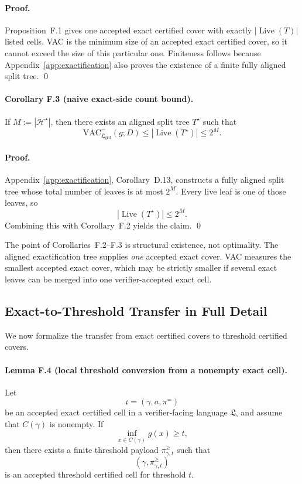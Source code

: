 \paragraph{Proof.}
Proposition~F.1 gives one accepted exact certified cover with exactly $|\operatorname{Live}(T)|$ listed cells. VAC is the minimum size of an accepted exact certified cover, so it cannot exceed the size of this particular one. Finiteness follows because Appendix~\ref{app:exactification} also proves the existence of a finite fully aligned split tree. \qed

\paragraph{Corollary F.3 (naive exact-side count bound).}
If $M:=|\mathcal H^\star|$, then there exists an aligned split tree $T^\star$ such that
\[
\mathrm{VAC}^{=}_{\mathfrak L_{\mathrm{grd}}}(g;D)
\le
|\operatorname{Live}(T^\star)|
\le
2^M.
\]

\paragraph{Proof.}
Appendix~\ref{app:exactification}, Corollary~D.13, constructs a fully aligned split tree whose total number of leaves is at most $2^M$. Every live leaf is one of those leaves, so
\[
|\operatorname{Live}(T^\star)|\le 2^M.
\]
Combining this with Corollary~F.2 yields the claim. \qed

The point of Corollaries~F.2--F.3 is structural existence, not optimality. The aligned exactification tree supplies \emph{one} accepted exact cover. VAC measures the smallest accepted exact cover, which may be strictly smaller if several exact leaves can be merged into one verifier-accepted exact cell.

\subsection{Exact-to-Threshold Transfer in Full Detail}

We now formalize the transfer from exact certified covers to threshold certified covers.

\paragraph{Lemma F.4 (local threshold conversion from a nonempty exact cell).}
Let
\[
\mathfrak c=(\gamma,a,\pi^{=})
\]
be an accepted exact certified cell in a verifier-facing language $\mathfrak L$, and assume that $C(\gamma)$ is nonempty. If
\[
\inf_{x\in C(\gamma)} g(x)\ge t,
\]
then there exists a finite threshold payload $\pi^{\ge}_{\gamma,t}$ such that
\[
(\gamma,\pi^{\ge}_{\gamma,t})
\]
is an accepted threshold certified cell for threshold $t$.

